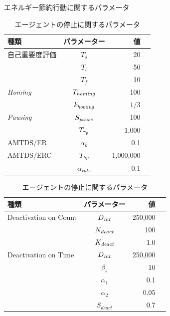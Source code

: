 \documentclass[12pt,a4j,twoside]{jarticle}
\def\HomingCheck{{T_{\it homing}}}
\def\PausingInt{{S_{\it pause}}}
\def\PauseTimeFactor{{\gamma_{\it p}}}
\def\DeactCheckInterval{D_{\it int}}
\def\DeactCount{N_{\it deact}}
\def\DeactThreshold{K_{\it deact}}
\begin{document}
\begin{table}
    \begin{minipage}[t]{.55\textwidth}
      \centering
      \caption{エネルギー節約行動に関するパラメータ}
      \begin{tabular}{lcrr} \\ \hline
        種類 & パラメーター & 値 \\ \hline
        自己重要度評価 & $T_s$ & 20 \\
                      & $T_l$ & 50 \\
                      & $T_f$ & 10 \\ \hline
        {\em Homing} & $\HomingCheck$ & 100 \\
               & $k_{homing}$ & $1/3$ \\ \hline
        {\em Pausing} & $\PausingInt$ & 100 \\
                & $T_\PauseTimeFactor$ & 1,000 \\ \hline  
        AMTDS/ER & $\alpha_k$ & 0.1 \\ \hline
        AMTDS/ERC & $T_{hp}$ & 1,000,000 \\
                  & $\alpha_{rate}$ & 0.1 \\ \hline       
      \end{tabular}
      \label{tb:3}
    \end{minipage}
    \hfill
    \begin{minipage}[t]{.55\textwidth}
      \centering
      \caption{エージェントの停止に関するパラメータ}
      \begin{tabular}{lcrr} \\ \hline
        種類 & パラメーター & 値 \\ \hline
        Deactivation on Count & $\DeactCheckInterval$ & 250,000 \\
                                & $\DeactCount$ & 100 \\
                                & $\DeactThreshold$ & 1.0 \\ \hline
        Deactivation on Time & $\DeactCheckInterval$ & 250,000 \\
                              & $\beta_s$ & 10 \\
                              & $\alpha_1$ & 0.1 \\
                              & $\alpha_2$ & 0.05 \\
                              & $S_{deact}$ & 0.7 \\ \hline
        \end{tabular}
      \label{tb:4}
    \end{minipage}
  \end{table}
\end{document}
